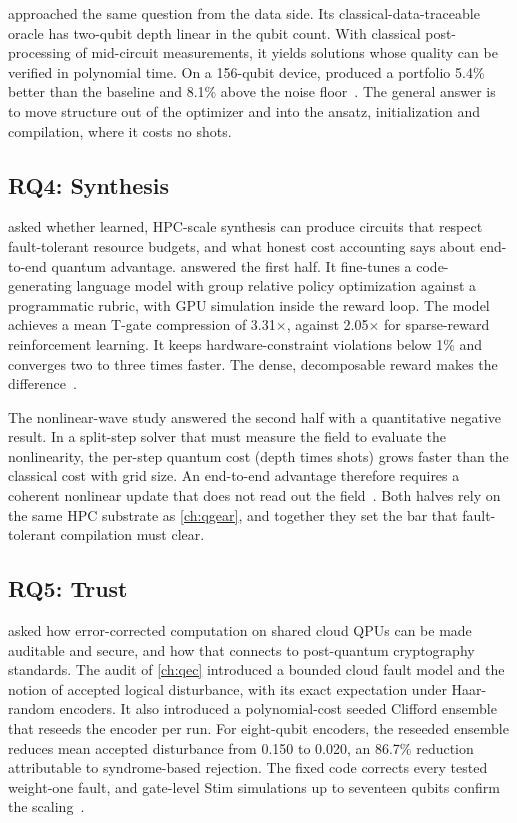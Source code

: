 \qawa{} approached the same question from the data side. Its classical-data-traceable oracle has two-qubit depth linear in the qubit count. With classical post-processing of mid-circuit measurements, it yields solutions whose quality can be verified in polynomial time. On a 156-qubit device, \qawa{} produced a portfolio 5.4\% better than the baseline and 8.1\% above the noise floor~\cite{guo2025qawa}. The general answer is to move structure out of the optimizer and into the ansatz, initialization and compilation, where it costs no shots.

\subsection{RQ4: Synthesis}\label{sec:conclusion:rq4}

 asked whether learned, HPC-scale synthesis can produce circuits that respect fault-tolerant resource budgets, and what honest cost accounting says about end-to-end quantum advantage. \rubriq{} answered the first half. It fine-tunes a code-generating language model with group relative policy optimization against a programmatic rubric, with GPU simulation inside the reward loop. The model achieves a mean T-gate compression of 3.31$\times$, against 2.05$\times$ for sparse-reward reinforcement learning. It keeps hardware-constraint violations below 1\% and converges two to three times faster. The dense, decomposable reward makes the difference~\cite{guo2026rubriq}.

The nonlinear-wave study answered the second half with a quantitative negative result. In a split-step solver that must measure the field to evaluate the nonlinearity, the per-step quantum cost (depth times shots) grows faster than the classical cost with grid size. An end-to-end advantage therefore requires a coherent nonlinear update that does not read out the field~\cite{guo2026nonlinearwaves}. Both halves rely on the same HPC substrate as \cref{ch:qgear}, and together they set the bar that fault-tolerant compilation must clear.

\subsection{RQ5: Trust}\label{sec:conclusion:rq5}

 asked how error-corrected computation on shared cloud QPUs can be made auditable and secure, and how that connects to post-quantum cryptography standards. The audit of \cref{ch:qec} introduced a bounded cloud fault model and the notion of accepted logical disturbance, with its exact expectation under Haar-random encoders. It also introduced a polynomial-cost seeded Clifford ensemble that reseeds the encoder per run. For eight-qubit encoders, the reseeded ensemble reduces mean accepted disturbance from 0.150 to 0.020, an 86.7\% reduction attributable to syndrome-based rejection. The fixed  code corrects every tested weight-one fault, and gate-level Stim simulations up to seventeen qubits confirm the scaling~\cite{guo2026qecaudit}.

